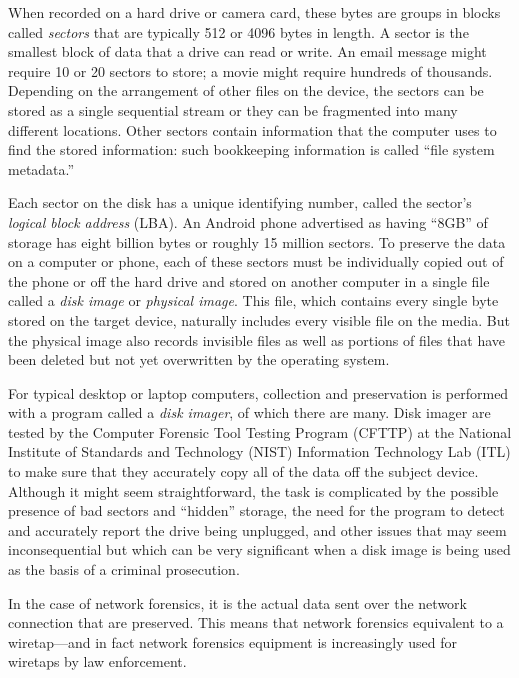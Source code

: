 When recorded on a hard drive or camera card, these bytes are groups in
  blocks called \emph{sectors} that are typically 512 or 4096 bytes in
  length. A sector is the smallest block of data that a drive can read
  or write. An email message might require 10 or 20 sectors to
  store; a movie might require hundreds of thousands. Depending on the
  arrangement of other files on the device, the sectors can be stored
  as a single sequential stream or they can be fragmented into many
  different locations. Other sectors contain information that the
  computer uses to find the stored information: such bookkeeping
  information is called ``file system metadata.''

  Each sector on the disk has a unique identifying number, called
  the sector's \emph{logical block address} (LBA). An Android phone
  advertised as having ``8GB'' of storage has eight billion bytes or roughly 15
  million sectors.  To preserve the data on a computer or phone, each of these sectors
  must be individually copied out of the phone or off the hard drive and
  stored on another computer in a single file called a \emph{disk image}
  or \emph{physical image}. This file, which contains every single byte
  stored on the target device, naturally includes every
  visible file on the media. But the physical image also records
  invisible files as well as portions of files that have been deleted
  but not yet overwritten by the operating system. 

  For typical desktop or laptop computers, collection and preservation
  is performed with a program called a \emph{disk imager}, of which there
  are many. Disk imager  are tested by the Computer Forensic
  Tool Testing Program (CFTTP) at the National Institute of Standards and
  Technology (NIST) Information Technology Lab (ITL) to make sure that
  they accurately copy all of the data off the subject
  device. Although it might seem straightforward, the task is
  complicated by the possible presence of bad sectors and ``hidden''
  storage, the need for the program to detect and accurately report
  the drive being unplugged, and other issues that may seem
  inconsequential but which can be very significant when a disk image
  is being used as the basis of a criminal prosecution. 

  In the case of network forensics, it is the actual data
  sent over the network connection that are preserved. This means that network forensics
  equivalent to a wiretap---and in fact network forensics equipment is
  increasingly used for wiretaps by law enforcement. 

